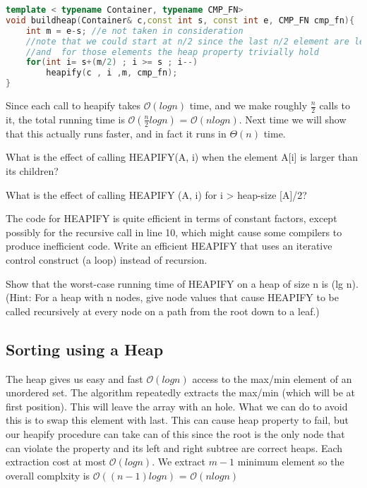 \begin{lstlisting}[language=c++, caption="Create an heap from an unordered collection. cmp\_fn determines if it will be a min or max heap"]
template < typename Container, typename CMP_FN>
void buildheap(Container& c,const int s, const int e, CMP_FN cmp_fn){
    int m = e-s; //e not taken in consideration
    //note that we could start at n/2 since the last n/2 element are leafs
    //and  for those elements the heap property trivially hold
    for(int i= s+(m/2) ; i >= s ; i--)
        heapify(c , i ,m, cmp_fn);
}
\end{lstlisting}
 Since each call to heapify takes $\mathcal{O}(log n)$ time, and we make roughly $\frac{n}{2}$ calls to it, the total running time is $\mathcal{O}(\frac{n}{2} log n)$ = $\mathcal{O}(nlog n)$. Next time we will show that this actually runs faster, and in fact it runs in $\mathcal{\Theta}(n)$ time.
 
\begin{problem}

What is the effect of calling HEAPIFY(A, i) when the element A[i] is larger than its children?
\end{problem}

\begin{problem}

What is the effect of calling HEAPIFY (A, i) for i > heap-size [A]/2?
\end{problem}

\begin{problem}

The code for HEAPIFY is quite efficient in terms of constant factors, except possibly for the recursive call in line 10, which might cause some compilers to produce inefficient code. Write an efficient HEAPIFY that uses an iterative control construct (a loop) instead of recursion.
\end{problem}

\begin{problem}

Show that the worst-case running time of HEAPIFY on a heap of size n is (lg n). (Hint: For a heap with n nodes, give node values that cause HEAPIFY to be called recursively at every node on a path from the root down to a leaf.)
\end{problem}



 
 
 
\subsection{Sorting using a Heap}
The heap gives us easy and fast $\mathcal{O}(log n)$ access to the max/min element of an unordered set.
The algorithm repeatedly extracts the max/min (which will be at first position). This will leave the array with an hole. What we can do to avoid this is to swap this element with last. This can cause heap property to fail, but our heapify procedure can take can of this since the root is the only node that can violate the property and its left and right subtree are correct heaps.
Each extraction cost at most $\mathcal{O}(log n)$. We extract $m-1$ minimum element so the overall complxity is $\mathcal{O}((n-1)log n)$ = $\mathcal{O}(nlog n)$

